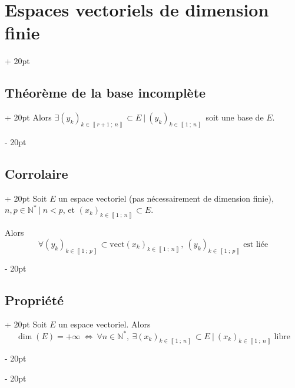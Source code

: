 \documentclass[a4paper, 12pt, twoside]{article}
\newcommand{\N}{\mathbb{N}} %
\newcommand{\nset}[2]{\left\llbracket #1\ ;\ #2 \right\rrbracket}
\newcommand{\ssi}{\ \Leftrightarrow \ }
\newcommand{\ind}[1][20pt]{\advance\leftskip + #1}
\newcommand{\deind}[1][20pt]{\advance\leftskip - #1}
\newenvironment{indt}[2][20pt]{#2 \par \ind[#1]}{\par \deind} %
\begin{document}
\begin{indt}{\section{Espaces vectoriels de dimension finie}}
\begin{indt}{\subsection{Théorème de la base incomplète}}
            Alors $\exists (y_k)_{k \in \nset{r + 1}{n}} \subset E \ |\ (y_k)_{k \in \nset 1 n}$ soit une base de $E$.
        \end{indt}
        
        \vspace{12pt}
        
        \begin{indt}{\subsection{Corrolaire}}
            Soit $E$ un espace vectoriel (pas nécessairement de dimension finie), $n, p \in \N^*\ |\ n < p$, et $(x_k)_{k \in \nset 1 n} \subset E$.
            
            Alors
                \[ \forall (y_k)_{k \in \nset 1 p} \subset \mathrm{vect}(x_k)_{k \in \nset 1 n},\ (y_k)_{k \in \nset 1 p}\ \text{est liée} \]
        \end{indt}
        
        \vspace{12pt}
        
        \begin{indt}{\subsection{Propriété}}
            Soit $E$ un espace vectoriel. Alors
                \[ \dim(E) = +\infty \ssi \forall n \in \N^*,\ \exists (x_k)_{k \in \nset 1 n} \subset E\ |\ (x_k)_{k \in \nset 1 n}\ \text{libre} \]
        \end{indt}
        
    \end{indt}
    
    \vspace{12pt}
    
\end{document}
